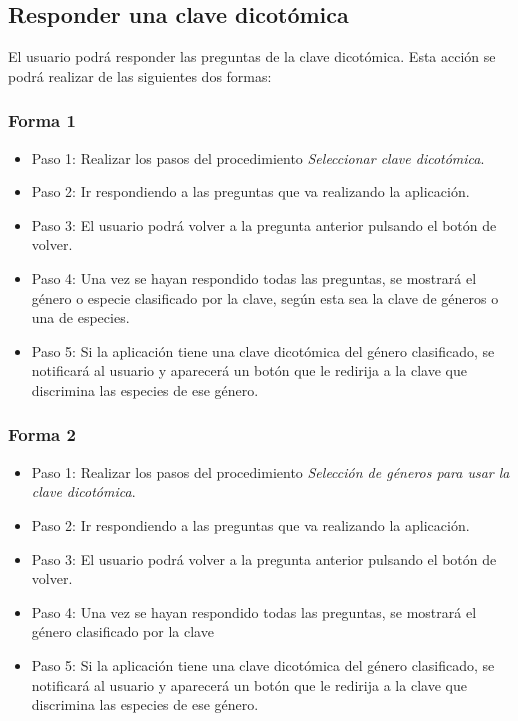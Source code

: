 \subsection{Responder una clave dicotómica}

El usuario podrá responder las preguntas de la clave dicotómica. Esta acción se podrá realizar de las siguientes dos formas:

\subsubsection{Forma 1}

\begin{itemize}
	\item Paso 1: Realizar los pasos del procedimiento \textit{Seleccionar clave dicotómica}.
	\item Paso 2: Ir respondiendo a las preguntas que va realizando la aplicación.
	\item Paso 3: El usuario podrá volver a la pregunta anterior pulsando el botón de volver.
	\item Paso 4: Una vez se hayan respondido todas las preguntas, se mostrará el género o especie clasificado por la clave, según esta sea la clave de géneros o una de especies.
	\item Paso 5: Si la aplicación tiene una clave dicotómica del género clasificado, se notificará al usuario y aparecerá un botón que le redirija a la clave que discrimina las especies de ese género.
\end{itemize}

\subsubsection{Forma 2}

\begin{itemize}
	\item Paso 1: Realizar los pasos del procedimiento \textit{Selección de géneros para usar la clave dicotómica}.
	\item Paso 2: Ir respondiendo a las preguntas que va realizando la aplicación.
	\item Paso 3: El usuario podrá volver a la pregunta anterior pulsando el botón de volver.
	\item Paso 4: Una vez se hayan respondido todas las preguntas, se mostrará el género clasificado por la clave
	\item Paso 5: Si la aplicación tiene una clave dicotómica del género clasificado, se notificará al usuario y aparecerá un botón que le redirija a la clave que discrimina las especies de ese género.
\end{itemize}

